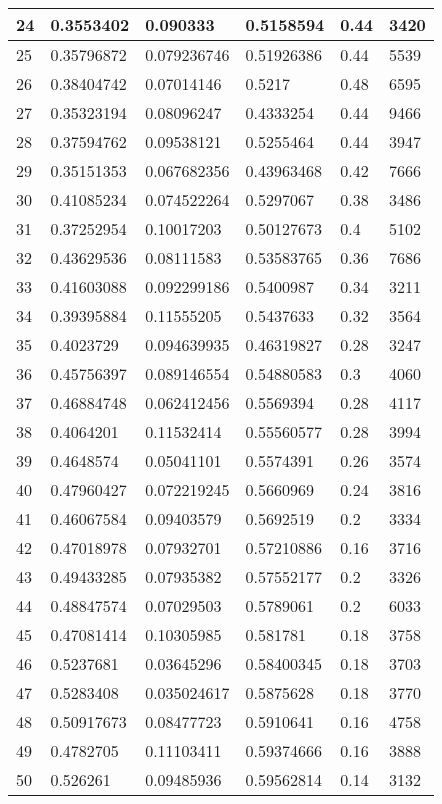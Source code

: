 \begin{longtable}{|l|l|l|l|l|l|}
24 & 0.3553402 & 0.090333 & 0.5158594 & 0.44 & 3420 \\ \hline 
25 & 0.35796872 & 0.079236746 & 0.51926386 & 0.44 & 5539 \\ \hline 
26 & 0.38404742 & 0.07014146 & 0.5217 & 0.48 & 6595 \\ \hline 
27 & 0.35323194 & 0.08096247 & 0.4333254 & 0.44 & 9466 \\ \hline 
28 & 0.37594762 & 0.09538121 & 0.5255464 & 0.44 & 3947 \\ \hline 
29 & 0.35151353 & 0.067682356 & 0.43963468 & 0.42 & 7666 \\ \hline 
30 & 0.41085234 & 0.074522264 & 0.5297067 & 0.38 & 3486 \\ \hline 
31 & 0.37252954 & 0.10017203 & 0.50127673 & 0.4 & 5102 \\ \hline 
32 & 0.43629536 & 0.08111583 & 0.53583765 & 0.36 & 7686 \\ \hline 
33 & 0.41603088 & 0.092299186 & 0.5400987 & 0.34 & 3211 \\ \hline 
34 & 0.39395884 & 0.11555205 & 0.5437633 & 0.32 & 3564 \\ \hline 
35 & 0.4023729 & 0.094639935 & 0.46319827 & 0.28 & 3247 \\ \hline 
36 & 0.45756397 & 0.089146554 & 0.54880583 & 0.3 & 4060 \\ \hline 
37 & 0.46884748 & 0.062412456 & 0.5569394 & 0.28 & 4117 \\ \hline 
38 & 0.4064201 & 0.11532414 & 0.55560577 & 0.28 & 3994 \\ \hline 
39 & 0.4648574 & 0.05041101 & 0.5574391 & 0.26 & 3574 \\ \hline 
40 & 0.47960427 & 0.072219245 & 0.5660969 & 0.24 & 3816 \\ \hline 
41 & 0.46067584 & 0.09403579 & 0.5692519 & 0.2 & 3334 \\ \hline 
42 & 0.47018978 & 0.07932701 & 0.57210886 & 0.16 & 3716 \\ \hline 
43 & 0.49433285 & 0.07935382 & 0.57552177 & 0.2 & 3326 \\ \hline 
44 & 0.48847574 & 0.07029503 & 0.5789061 & 0.2 & 6033 \\ \hline 
45 & 0.47081414 & 0.10305985 & 0.581781 & 0.18 & 3758 \\ \hline 
46 & 0.5237681 & 0.03645296 & 0.58400345 & 0.18 & 3703 \\ \hline 
47 & 0.5283408 & 0.035024617 & 0.5875628 & 0.18 & 3770 \\ \hline 
48 & 0.50917673 & 0.08477723 & 0.5910641 & 0.16 & 4758 \\ \hline 
49 & 0.4782705 & 0.11103411 & 0.59374666 & 0.16 & 3888 \\ \hline 
50 & 0.526261 & 0.09485936 & 0.59562814 & 0.14 & 3132 \\ \hline 
\end{longtable}